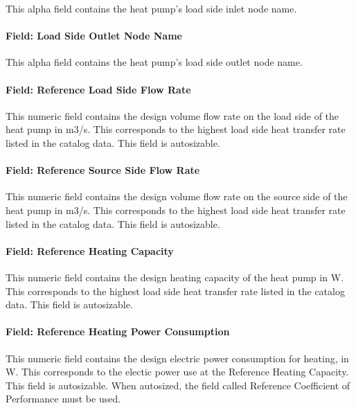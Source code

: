 This alpha field contains the heat pump's load side inlet node name.

\paragraph{Field: Load Side Outlet Node Name}\label{field-load-side-outlet-node-name-1}

This alpha field contains the heat pump's load side outlet node name.

\paragraph{Field: Reference Load Side Flow Rate}\label{field-rated-load-side-flow-rate-1}

This numeric field contains the design volume flow rate on the load side of the heat pump in m3/s. This corresponds to the highest load side heat transfer rate listed in the catalog data. This field is autosizable.

\paragraph{Field: Reference Source Side Flow Rate}\label{field-rated-source-side-flow-rate-1}

This numeric field contains the design volume flow rate on the source side of the heat pump in m3/s. This corresponds to the highest load side heat transfer rate listed in the catalog data. This field is autosizable.

\paragraph{Field: Reference Heating Capacity}\label{field-rated-heating-capacity-000}

This numeric field contains the design heating capacity of the heat pump in W. This corresponds to the highest load side heat transfer rate listed in the catalog data. This field is autosizable.

\paragraph{Field: Reference Heating Power Consumption}\label{field-rated-heating-power-consumption}

This numeric field contains the design electric power consumption for heating, in W. This corresponds to the electic power use at the Reference Heating Capacity. This field is autosizable.  When autosized, the field called Reference Coefficient of Performance must be used.

